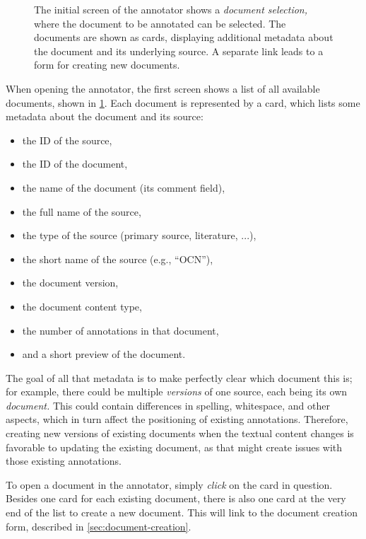 \begin{figure}[htb]
  \caption{
    The initial screen of the annotator shows a \emph{document selection,} where the document to be annotated can be selected.
    The documents are shown as cards, displaying additional metadata about the document and its underlying source.
    A separate link leads to a form for creating new documents.
  }
  \label{fig:document-selection}
\end{figure}

When opening the annotator, the first screen shows a list of all available documents, shown in \cref{fig:document-selection}.
Each document is represented by a card, which lists some metadata about the document and its source:

\begin{itemize}
  \item the ID of the source,
  \item the ID of the document,
  \item the name of the document (its comment field),
  \item the full name of the source,
  \item the type of the source (primary source, literature, ...),
  \item the short name of the source (e.g., \enquote{OCN}),
  \item the document version,
  \item the document content type,
  \item the number of annotations in that document,
  \item and a short preview of the document.
\end{itemize}

The goal of all that metadata is to make perfectly clear which document this is;
for example, there could be multiple \emph{versions} of one source, each being its own \emph{document.}
This could contain differences in spelling, whitespace, and other aspects, which in turn affect the positioning of existing annotations.
Therefore, creating new versions of existing documents when the textual content changes is favorable to updating the existing document, as that might create issues with those existing annotations.

To open a document in the annotator, simply \emph{click} on the card in question.
Besides one card for each existing document, there is also one card at the very end of the list to create a new document.
This will link to the document creation form, described in \cref{sec:document-creation}.



